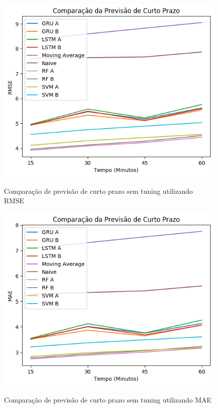 \label{attachment:comparisons}


\begin{figure}[htbp]
    \centering
    \includegraphics[scale=0.8]{monography/img/comparisons/comparacao_da_previsao_de_curto_prazo_rmse.png}
    \label{figure:previsao_de_curto_prazo_rmse}
    \caption{Comparação de previsão de curto prazo sem tuning utilizando RMSE}
\end{figure}

\begin{figure}[htbp]
    \centering
    \includegraphics[scale=0.8]{monography/img/comparisons/comparacao_da_previsao_de_curto_prazo_mae.png}
    \label{figure:previsao_de_curto_prazo_mae}
    \caption{Comparação de previsão de curto prazo sem tuning utilizando MAE}
\end{figure}

